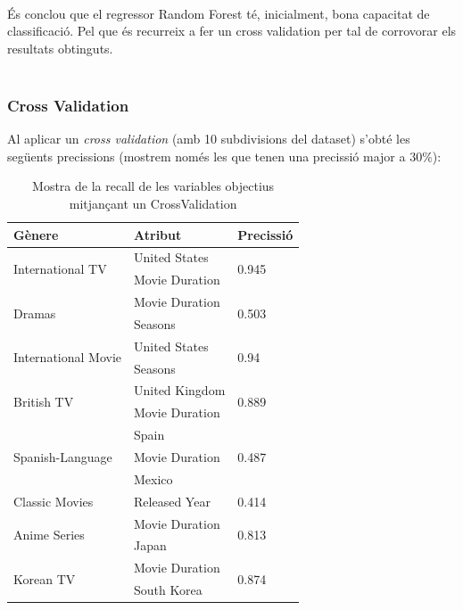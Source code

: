 \documentclass[a4paper, 11pt]{article}
\begin{document}
\\
És conclou que el regressor Random Forest té, inicialment, bona capacitat de classificació. Pel que és recurreix a fer un cross validation per tal de corrovorar els resultats obtinguts.\\\\

\newpage 

\subsubsection{Cross Validation}
Al aplicar un \textit{cross validation} (amb 10 subdivisions del dataset) s'obté les següents precissions (mostrem només les que tenen una precissió major a $30\%$):
\begin{table}[h]
    \centering
    \begin{tabular}{l|l|l}
        \textbf{Gènere} & \textbf{Atribut} & \textbf{Precissió}\\\hline\hline
            \multirow{2}{*}{International TV} &  United States & \multirow{2}{*}{0.945} \\
            & Movie Duration& \\ \hline
        \multirow{2}{*}{Dramas} &  Movie Duration & \multirow{2}{*}{0.503} \\ 
        & Seasons & \\\hline
        \multirow{2}{*}{International Movie} &  United States & \multirow{2}{*}{0.94} \\
            & Seasons & \\ \hline
        \multirow{2}{*}{British TV} &  United Kingdom & \multirow{2}{*}{0.889} \\
            & Movie Duration &  \\ \hline
        \multirow{3}{*}{Spanish-Language} &  Spain & \multirow{3}{*}{0.487} \\
            & Movie Duration & \\
            & Mexico & \\ \hline
        Classic Movies & Released Year & 0.414 \\ \hline
        \multirow{2}{*}{Anime Series} & Movie Duration & \multirow{2}{*}{0.813}\\
        & Japan & \\ \hline
        \multirow{2}{*}{Korean TV} & Movie Duration & \multirow{2}{*}{0.874}\\
        & South Korea & \\ 
        
    \end{tabular}
    \caption{Mostra de la recall de les variables objectius mitjançant un CrossValidation}
    \label{tab:my_label}
\end{table}\\
\end{document}
